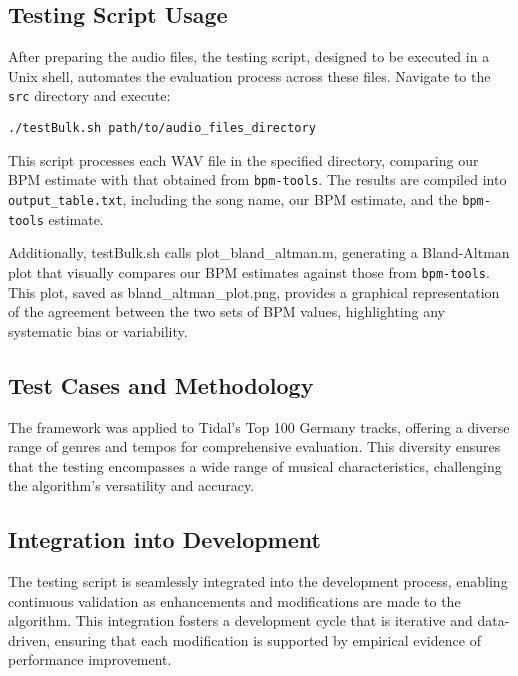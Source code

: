 \subsection{Testing Script Usage}

After preparing the audio files, the testing script, designed to be executed in a Unix shell, automates the evaluation process across these files. Navigate to the \texttt{src} directory and execute:

\lstset{style=ShellStyle}
\begin{lstlisting}[caption={Executing the Testing Framework}, label=lst]
./testBulk.sh path/to/audio_files_directory
\end{lstlisting}

This script processes each WAV file in the specified directory, comparing our BPM estimate with that obtained from \texttt{bpm-tools}. The results are compiled into \texttt{output\_table.txt}, including the song name, our BPM estimate, and the \texttt{bpm-tools} estimate.

Additionally, testBulk.sh calls plot\_bland\_altman.m, generating a Bland-Altman plot that visually compares our BPM estimates against those from \texttt{bpm-tools}. This plot, saved as bland\_altman\_plot.png, provides a graphical representation of the agreement between the two sets of BPM values, highlighting any systematic bias or variability.

\subsection{Test Cases and Methodology}

The framework was applied to Tidal's Top 100 Germany tracks, offering a diverse range of genres and tempos for comprehensive evaluation. This diversity ensures that the testing encompasses a wide range of musical characteristics, challenging the algorithm's versatility and accuracy.

\subsection{Integration into Development}

The testing script is seamlessly integrated into the development process, enabling continuous validation as enhancements and modifications are made to the algorithm. This integration fosters a development cycle that is iterative and data-driven, ensuring that each modification is supported by empirical evidence of performance improvement.

